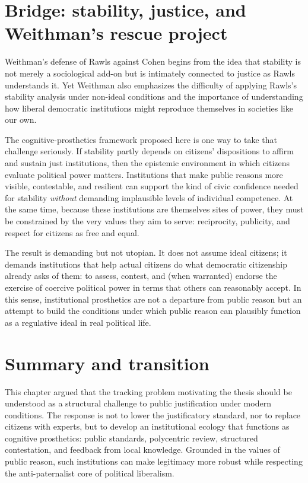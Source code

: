 \documentclass[12pt]{report}
\begin{document}
\section{Bridge: stability, justice, and Weithman’s rescue project}

Weithman’s defense of Rawls against Cohen begins from the idea that stability is not merely a sociological add-on but is intimately connected to justice as Rawls understands it. \parencite[p.~1188]{Weithman2024Rescuing}
Yet Weithman also emphasizes the difficulty of applying Rawls’s stability analysis under non-ideal conditions and the importance of understanding how liberal democratic institutions might reproduce themselves in societies like our own. \parencite[p.~1188]{Weithman2024Rescuing}

The cognitive-prosthetics framework proposed here is one way to take that challenge seriously.
If stability partly depends on citizens’ dispositions to affirm and sustain just institutions, then the epistemic environment in which citizens evaluate political power matters.
Institutions that make public reasons more visible, contestable, and resilient can support the kind of civic confidence needed for stability \emph{without} demanding implausible levels of individual competence.
At the same time, because these institutions are themselves sites of power, they must be constrained by the very values they aim to serve: reciprocity, publicity, and respect for citizens as free and equal.

The result is demanding but not utopian.
It does not assume ideal citizens; it demands institutions that help actual citizens do what democratic citizenship already asks of them: to assess, contest, and (when warranted) endorse the exercise of coercive political power in terms that others can reasonably accept. \parencite[p.~769]{rawls1997public}
In this sense, institutional prosthetics are not a departure from public reason but an attempt to build the conditions under which public reason can plausibly function as a regulative ideal in real political life.

\section{Summary and transition}

This chapter argued that the tracking problem motivating the thesis should be understood as a structural challenge to public justification under modern conditions.
The response is not to lower the justificatory standard, nor to replace citizens with experts, but to develop an institutional ecology that functions as cognitive prosthetics: public standards, polycentric review, structured contestation, and feedback from local knowledge.
Grounded in the values of public reason, such institutions can make legitimacy more robust while respecting the anti-paternalist core of political liberalism.
\end{document}
